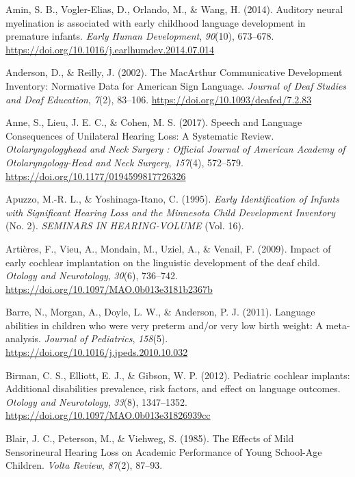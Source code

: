 \documentclass[english,man]{apa6}
\begin{document}
\leavevmode\hypertarget{ref-amin2014}{}%
Amin, S. B., Vogler-Elias, D., Orlando, M., \& Wang, H. (2014). Auditory neural myelination is associated with early childhood language development in premature infants. \emph{Early Human Development}, \emph{90}(10), 673--678. \url{https://doi.org/10.1016/j.earlhumdev.2014.07.014}

\leavevmode\hypertarget{ref-anderson2002}{}%
Anderson, D., \& Reilly, J. (2002). The MacArthur Communicative Development Inventory: Normative Data for American Sign Language. \emph{Journal of Deaf Studies and Deaf Education}, \emph{7}(2), 83--106. \url{https://doi.org/10.1093/deafed/7.2.83}

\leavevmode\hypertarget{ref-anne2017}{}%
Anne, S., Lieu, J. E. C., \& Cohen, M. S. (2017). Speech and Language Consequences of Unilateral Hearing Loss: A Systematic Review. \emph{Otolaryngologyhead and Neck Surgery : Official Journal of American Academy of Otolaryngology-Head and Neck Surgery}, \emph{157}(4), 572--579. \url{https://doi.org/10.1177/0194599817726326}

\leavevmode\hypertarget{ref-apuzzo1995}{}%
Apuzzo, M.-R. L., \& Yoshinaga-Itano, C. (1995). \emph{Early Identification of Infants with Significant Hearing Loss and the Minnesota Child Development Inventory} (No. 2). \emph{SEMINARS IN HEARING-VOLUME} (Vol. 16).

\leavevmode\hypertarget{ref-artieres2009}{}%
Artières, F., Vieu, A., Mondain, M., Uziel, A., \& Venail, F. (2009). Impact of early cochlear implantation on the linguistic development of the deaf child. \emph{Otology and Neurotology}, \emph{30}(6), 736--742. \url{https://doi.org/10.1097/MAO.0b013e3181b2367b}

\leavevmode\hypertarget{ref-barre2011}{}%
Barre, N., Morgan, A., Doyle, L. W., \& Anderson, P. J. (2011). Language abilities in children who were very preterm and/or very low birth weight: A meta-analysis. \emph{Journal of Pediatrics}, \emph{158}(5). \url{https://doi.org/10.1016/j.jpeds.2010.10.032}

\leavevmode\hypertarget{ref-birman2012}{}%
Birman, C. S., Elliott, E. J., \& Gibson, W. P. (2012). Pediatric cochlear implants: Additional disabilities prevalence, risk factors, and effect on language outcomes. \emph{Otology and Neurotology}, \emph{33}(8), 1347--1352. \url{https://doi.org/10.1097/MAO.0b013e31826939cc}

\leavevmode\hypertarget{ref-blair1985}{}%
Blair, J. C., Peterson, M., \& Viehweg, S. (1985). The Effects of Mild Sensorineural Hearing Loss on Academic Performance of Young School-Age Children. \emph{Volta Review}, \emph{87}(2), 87--93.
\end{document}

